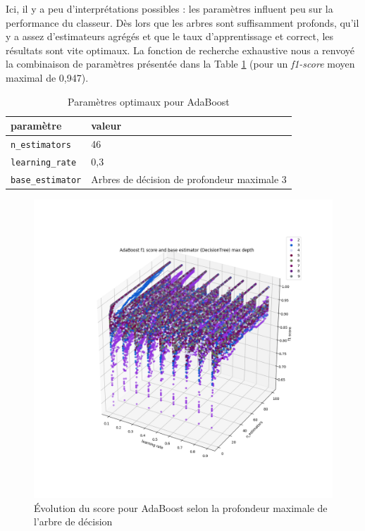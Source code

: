 \documentclass[a4paper]{report}
\begin{document}
Ici, il y a peu d'interprétations possibles : les paramètres influent peu sur la performance du classeur. Dès lors que les arbres sont suffisamment profonds, qu'il y a assez d'estimateurs agrégés et que le taux d'apprentissage et correct, les résultats sont vite optimaux. La fonction de recherche exhaustive nous a renvoyé la combinaison de paramètres présentée dans la Table \ref{best_params_ada} (pour un \emph{f1-score} moyen maximal de 0,947).

\begin{table}
\centering
\begin{tabular}{ll}
paramètre & valeur \\
\hline
\texttt{n\_estimators} & 46 \\
\texttt{learning\_rate} & 0,3 \\
\texttt{base\_estimator} & Arbres de décision de profondeur maximale 3\\
\end{tabular}
\caption{Paramètres optimaux pour AdaBoost\label{best_params_ada}}
\end{table}

\begin{figure}
\centering
\includegraphics[width=\textwidth]{img/adaboost_depth.png}
\caption{Évolution du score pour AdaBoost selon la profondeur maximale de l'arbre de décision\label{adaboost_depth}}
\end{figure}
\end{document}
